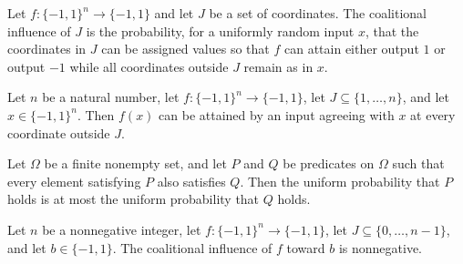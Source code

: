 \begin{definition}
\label{FABL.coalitionalInfluence}
\leanok
{}
Let $f:\{−1,1\}^n\to\{−1,1\}$ and let $J$ be a set of coordinates. The coalitional
influence of $J$ is the probability, for a uniformly random input $x$, that the
coordinates in $J$ can be assigned values so that $f$ can attain either output $1$ or
output $-1$ while all coordinates outside $J$ remain as in $x$.
\end{definition}

\begin{theorem}
\label{FABL.coalitionCanAttain_current}
\leanok
{}
Let $n$ be a natural number, let $f\colon\{−1,1\}^n\to\{−1,1\}$, let
$J\subseteq\{1,\ldots,n\}$, and let $x\in\{−1,1\}^n$. Then $f(x)$ can be attained by an
input agreeing with $x$ at every coordinate outside $J$.
\end{theorem}

\begin{theorem}
\label{FABL.uniformProbability_mono}
\leanok
{}
Let $\Omega$ be a finite nonempty set, and let $P$ and $Q$ be predicates on $\Omega$
such that every element satisfying $P$ also satisfies $Q$. Then the uniform probability
that $P$ holds is at most the uniform probability that $Q$ holds.
\end{theorem}

\begin{theorem}
\label{FABL.coalitionalInfluenceToward_nonneg}
\leanok
{}
Let $n$ be a nonnegative integer, let $f:\{-1,1\}^n\to\{-1,1\}$, let
$J\subseteq\{0,\ldots,n-1\}$, and let $b\in\{-1,1\}$. The coalitional influence
of $f$ toward $b$ is nonnegative.
\end{theorem}

